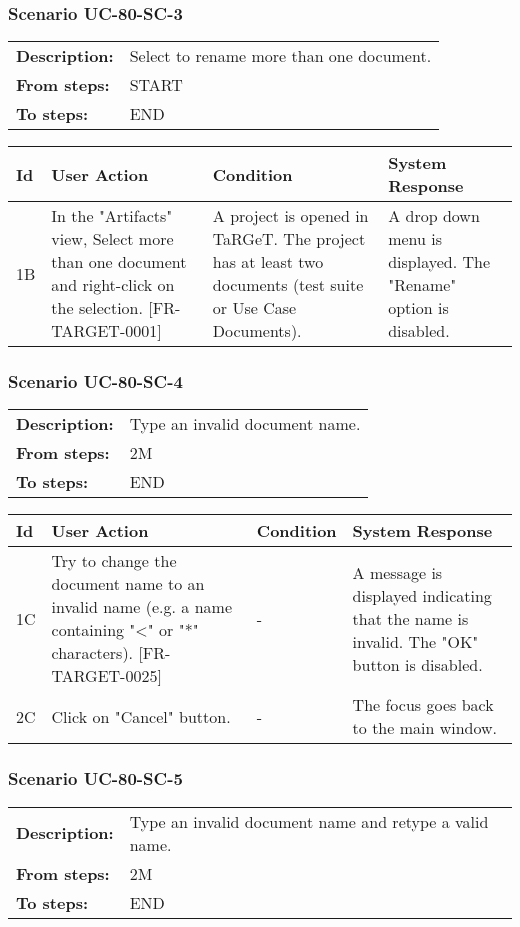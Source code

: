 \documentclass[a4paper,11pt]{article}
\newcommand{\bl}{\\ \hline}
\begin{document}
\subsubsection*{Scenario UC-80-SC-3}
\begin{tabular}{p{1in}p{4in}}
{\bf Description:} & Select to rename more than one document. \\
{\bf From steps:} & START \\
{\bf To steps:} & END \\
\end{tabular}
 
\begin{tabular}{|p{0.8in}|p{1.6in}|p{1.6in}|p{1.6in}|}
\hline
Id & User Action & Condition & System Response  \bl 
1B & In the "Artifacts" view, Select more than one document and right-click on the selection. [FR-TARGET-0001] & A project is opened in TaRGeT. The project has at least two documents (test suite or Use Case Documents). & A drop down menu is displayed. The "Rename" option is disabled. \bl 
\end{tabular}
\subsubsection*{Scenario UC-80-SC-4}
\begin{tabular}{p{1in}p{4in}}
{\bf Description:} & Type an invalid document name. \\
{\bf From steps:} & 2M \\
{\bf To steps:} & END \\
\end{tabular}
 
\begin{tabular}{|p{0.8in}|p{1.6in}|p{1.6in}|p{1.6in}|}
\hline
Id & User Action & Condition & System Response  \bl 
1C & Try to change the document name to an invalid name (e.g. a name containing "<" or "*" characters). [FR-TARGET-0025] & - & A message is displayed indicating that the name is invalid. The "OK" button is disabled. \bl 
2C & Click on "Cancel" button. & - & The focus goes back to the main window. \bl 
\end{tabular}
\subsubsection*{Scenario UC-80-SC-5}
\begin{tabular}{p{1in}p{4in}}
{\bf Description:} & Type an invalid document name and retype a valid name. \\
{\bf From steps:} & 2M \\
{\bf To steps:} & END \\
\end{tabular}
 
\end{document}
